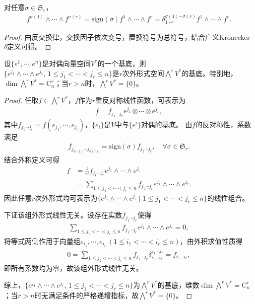 \documentclass[../../main.tex]{subfiles}%
\begin{document}
\begin{proposition}
对任意$\sigma\in\mathfrak{S}_r$，
\begin{align}
f^{\sigma(1)}\wedge\cdots\wedge f^{\sigma(r)}=\mathrm{sign}(\sigma)f^1\wedge\cdots\wedge f^r=\delta_{1\cdots r}^{\sigma(1)\cdots\sigma(r)}f^1\wedge\cdots\wedge f^r.
\label{eq:wedge_perm}
\end{align}
\end{proposition}
\begin{proof}
由反交换律，交换因子依次变号，置换符号为总符号，结合广义Kronecker $\delta$定义可得。
\end{proof}

\begin{theorem}
设$\{e^1,\cdots,e^n\}$是对偶向量空间$V^*$的一个基底，则$\{e^{j_1}\land\cdots\land e^{j_r},\,1\leqslant j_1<\cdots<j_r\leqslant n\}$是$r$次外形式空间$\bigwedge^r V^*$的基底。特别地，$\dim\bigwedge^r V^* = \mathrm{C}_n^r$；当$r>n$时，$\bigwedge^r V^* = \{0\}$。
\end{theorem}

\begin{proof}
任取$f\in\bigwedge^r V^*$，$f$作为$r$重反对称线性函数，可表示为
\begin{align*}
f = f_{j_1\cdots j_r}e^{j_1}\otimes\cdots\otimes e^{j_r},
\end{align*}
其中$f_{j_1\cdots j_r}=f(e_{j_1},\cdots,e_{j_r})$，$\{e_i\}$是$V$中与$\{e^i\}$对偶的基底。
由$f$的反对称性，系数满足
\begin{align*}
f_{j_{\sigma(1)}\cdots j_{\sigma(r)}} = \mathrm{sign}(\sigma)f_{j_1\cdots j_r},\quad \forall\sigma\in\mathfrak{S}_r.
\end{align*}
结合外积定义可得
\begin{align}
f &= \frac{1}{r!}f_{j_1\cdots j_r}e^{j_1}\land\cdots\land e^{j_r} \nonumber \\
&= \sum\limits_{1\leqslant j_1<\cdots<j_r\leqslant n} f_{j_1\cdots j_r}e^{j_1}\land\cdots\land e^{j_r}. \label{eq:r-form-basis-expand}
\end{align}
因此任意$r$次外形式均可表示为$\{e^{j_1}\land\cdots\land e^{j_r}\mid 1\leqslant j_1<\cdots<j_r\leqslant n\}$的线性组合。

下证该组外形式线性无关。设存在实数$f_{j_1\cdots j_r}$使得
\begin{align*}
\sum\limits_{1\leqslant j_1<\cdots<j_r\leqslant n} f_{j_1\cdots j_r}e^{j_1}\land\cdots\land e^{j_r}=0,
\end{align*}
将等式两侧作用于向量组$e_{i_1},\cdots,e_{i_r}\,(1\leqslant i_1<\cdots<i_r\leqslant n)$，由外积求值性质得
\begin{align*}
0 = \sum\limits_{1\leqslant j_1<\cdots<j_r\leqslant n} f_{j_1\cdots j_r}\delta_{i_1\cdots i_r}^{j_1\cdots j_r}=f_{i_1\cdots i_r},
\end{align*}
即所有系数均为零，故该组外形式线性无关。

综上，$\{e^{j_1}\land\cdots\land e^{j_r},\,1\leqslant j_1<\cdots<j_r\leqslant n\}$为$\bigwedge^r V^*$的基底，维数$\dim\bigwedge^r V^*=\mathrm{C}_n^r$；当$r>n$时无满足条件的严格递增指标，故$\bigwedge^r V^*=\{0\}$。
\end{proof}
\end{document}
